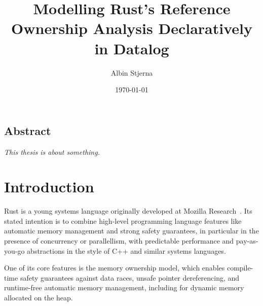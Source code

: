 \documentclass[11pt,a4paper,twoside,openany]{report}
\author{Albin Stjerna}
\date{\today}
\title{Modelling Rust's Reference Ownership Analysis Declaratively in Datalog}
\newcommand{\fixme}[1] {{\color{red}#1}}
\begin{document}


\maketitle

\section*{Abstract}
\textit{\fixme{This thesis is about something.}}


\begingroup
  \tableofcontents
\endgroup
  

\chapter{Introduction}

Rust is a young systems language originally developed at Mozilla
Research~\cite{matsakis_rust_2014}. Its stated intention is to combine
high-level programming language features like automatic memory management and
strong safety guarantees, in particular in the presence of concurrency or
parallellism, with predictable performance and pay-as-you-go abstractions in the
style of C++ and similar systems languages.

One of its core features is the memory ownership model, which enables
compile-time safety guarantees against data races, unsafe pointer dereferencing,
and runtime-free automatic memory management, including for dynamic memory
allocated on the heap.
\end{document}
